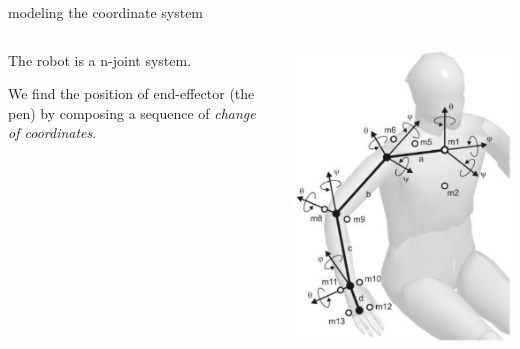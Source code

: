 \documentclass{beamer}
\begin{document}
\begin{frame}[allowframebreaks]{modeling the coordinate system}

\begin{columns}
\begin{column}{0.5\textwidth}
\justify
   The robot is a n-joint system. 
   
   We find the position of end-effector (the pen) by composing a sequence of \emph{change of coordinates}.
\end{column}
\begin{column}{0.5\textwidth}  %
    \begin{center}
     \includegraphics[scale = 0.35]{arm.jpg}\cite{3}
     \end{center}
\end{column}
\end{columns}




\end{frame}
\end{document}
